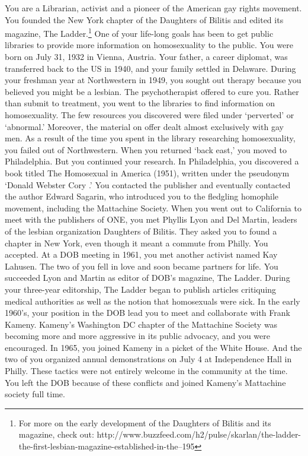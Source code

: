 You are a Librarian, activist and a pioneer of the American gay rights movement. You founded the New York chapter of the Daughters of Bilitis and edited its magazine, The Ladder.\footnote{For more on the early development of the Daughters of Bilitis and its magazine, check out: http:\slash \slash www.buzzfeed.com\slash h2\slash pulse\slash skarlan\slash the-ladder-the-first-lesbian-magazine-established-in-the--195} One of your life-long goals has been to get public libraries to provide more information on homosexuality to the public.
You were born on July 31, 1932 in Vienna, Austria. Your father, a career diplomat, was transferred back to the US in 1940, and your family settled in Delaware.
During your freshman year at Northwestern in 1949, you sought out therapy because you believed you might be a lesbian. The psychotherapist offered to cure you. Rather than submit to treatment, you went to the libraries to find information on homosexuality. The few resources you discovered were filed under `perverted' or `abnormal.' Moreover, the material on offer dealt almost exclusively with gay men.
As a result of the time you spent in the library researching homosexuality, you failed out of Northwestern. When you returned `back east,' you moved to Philadelphia.
But you continued your research. In Philadelphia, you discovered a book titled The Homosexual in America (1951), written under the pseudonym `Donald Webster Cory .' You contacted the publisher and eventually contacted the author Edward Sagarin, who introduced you to the fledgling homophile movement, including the Mattachine Society.
When you went out to California to meet with the publishers of ONE, you met Phyllis Lyon and Del Martin, leaders of the lesbian organization Daughters of Bilitis. They asked you to found a chapter in New York, even though it meant a commute from Philly. You accepted.
At a DOB meeting in 1961, you met another activist named Kay Lahusen. The two of you fell in love and soon became partners for life.
You succeeded Lyon and Martin as editor of DOB's magazine, The Ladder. During your three-year editorship, The Ladder began to publish articles critiquing medical authorities as well as the notion that homosexuals were sick.
In the early 1960's, your position in the DOB lead you to meet and collaborate with Frank Kameny. Kameny's Washington DC chapter of the Mattachine Society was becoming more and more aggressive in its public advocacy, and you were encouraged. In 1965, you joined Kameny in a picket of the White House. And the two of you organized annual demonstrations on July 4 at Independence Hall in Philly.
These tactics were not entirely welcome in the community at the time. You left the DOB because of these conflicts and joined Kameny's Mattachine society full time.

